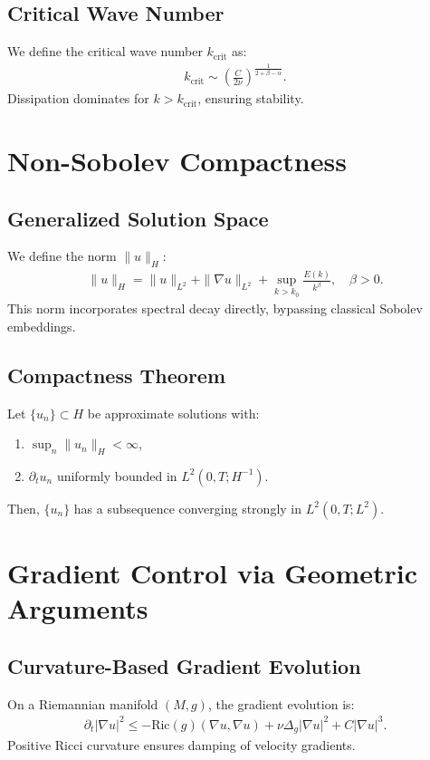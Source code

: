 \subsection{Critical Wave Number}
We define the critical wave number $k_{\text{crit}}$ as:
\begin{align}
k_{\text{crit}} \sim \left(\frac{C}{2\nu}\right)^{\frac{1}{2+\beta-\alpha}}.
\end{align}
Dissipation dominates for $k > k_{\text{crit}}$, ensuring stability.

\section{Non-Sobolev Compactness}
\subsection{Generalized Solution Space}
We define the norm $\|u\|_H$:
\begin{align}
\|u\|_H = \|u\|_{L^2} + \|\nabla u\|_{L^2} + \sup_{k>k_0} \frac{E(k)}{k^\beta}, \quad \beta > 0.
\end{align}
This norm incorporates spectral decay directly, bypassing classical Sobolev embeddings.

\subsection{Compactness Theorem}
\begin{theorem}[Compactness in $H$]
Let $\{u_n\} \subset H$ be approximate solutions with:
\begin{enumerate}
    \item $\sup_n \|u_n\|_H < \infty$,
    \item $\partial_t u_n$ uniformly bounded in $L^2(0,T;H^{-1})$.
\end{enumerate}
Then, $\{u_n\}$ has a subsequence converging strongly in $L^2(0,T;L^2)$.
\end{theorem}

\section{Gradient Control via Geometric Arguments}
\subsection{Curvature-Based Gradient Evolution}
On a Riemannian manifold $(M,g)$, the gradient evolution is:
\begin{align}
\partial_t |\nabla u|^2 \leq -\text{Ric}(g)(\nabla u, \nabla u) + \nu \Delta_g |\nabla u|^2 + C|\nabla u|^3.
\end{align}
Positive Ricci curvature ensures damping of velocity gradients.

